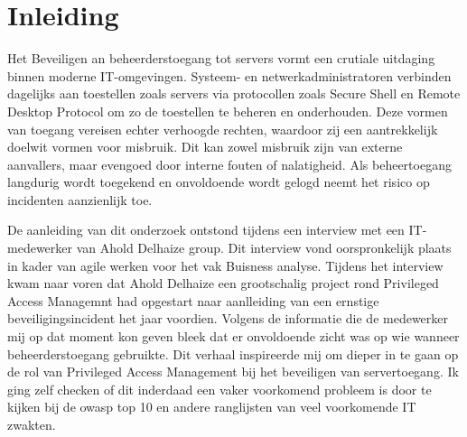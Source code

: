 


% 

\section{Inleiding}%
\label{sec:inleiding}

Het Beveiligen an beheerderstoegang tot servers vormt een crutiale uitdaging binnen moderne IT-omgevingen. Systeem- en netwerkadministratoren verbinden dagelijks aan toestellen zoals servers via protocollen zoals Secure Shell en Remote Desktop Protocol om zo de toestellen te beheren en onderhouden. Deze vormen van toegang vereisen echter verhoogde rechten, waardoor zij een aantrekkelijk doelwit vormen voor misbruik. Dit kan zowel misbruik zijn van externe aanvallers, maar evengoed door interne fouten of nalatigheid. Als beheertoegang langdurig wordt toegekend en onvoldoende wordt gelogd neemt het risico op incidenten aanzienlijk toe.

De aanleiding van dit onderzoek ontstond tijdens een interview met een IT-medewerker van Ahold Delhaize group. Dit interview vond oorspronkelijk plaats in kader van agile werken voor het vak Buisness analyse. Tijdens het interview kwam naar voren dat Ahold Delhaize een grootschalig project rond Privileged Access Managemnt had opgestart naar aanlleiding van een ernstige beveiligingsincident het jaar voordien. Volgens de informatie die de medewerker mij op dat moment kon geven bleek dat er onvoldoende zicht was op wie wanneer beheerderstoegang gebruikte. Dit verhaal inspireerde mij om dieper in te gaan op de rol van Privileged Access Management bij het beveiligen van servertoegang. Ik ging zelf checken of dit inderdaad een vaker voorkomend probleem is door te kijken bij de owasp top 10 en andere ranglijsten van veel voorkomende IT zwakten.

